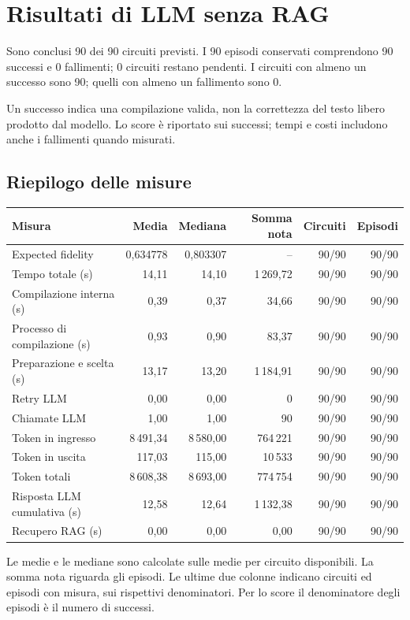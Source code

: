 \providecommand{\TestReportPath}{../}
\section{Risultati di LLM senza RAG}
Sono conclusi 90 dei 90 circuiti previsti. I 90 episodi conservati comprendono 90 successi e 0 fallimenti; 0 circuiti restano pendenti. I circuiti con almeno un successo sono 90; quelli con almeno un fallimento sono 0.

Un successo indica una compilazione valida, non la correttezza del testo libero prodotto dal modello. Lo score è riportato sui successi; tempi e costi includono anche i fallimenti quando misurati.

\subsection{Riepilogo delle misure}
\begingroup\footnotesize
\setlength{\tabcolsep}{5pt}
\begin{center}
\begin{tabular}{lrrrrr}
\toprule
Misura & Media & Mediana & Somma nota & Circuiti & Episodi \\
\midrule
Expected fidelity & 0,634778 & 0,803307 & -- & 90/90 & 90/90 \\
Tempo totale (s) & 14,11 & 14,10 & 1\,269,72 & 90/90 & 90/90 \\
Compilazione interna (s) & 0,39 & 0,37 & 34,66 & 90/90 & 90/90 \\
Processo di compilazione (s) & 0,93 & 0,90 & 83,37 & 90/90 & 90/90 \\
Preparazione e scelta (s) & 13,17 & 13,20 & 1\,184,91 & 90/90 & 90/90 \\
Retry LLM & 0,00 & 0,00 & 0 & 90/90 & 90/90 \\
Chiamate LLM & 1,00 & 1,00 & 90 & 90/90 & 90/90 \\
Token in ingresso & 8\,491,34 & 8\,580,00 & 764\,221 & 90/90 & 90/90 \\
Token in uscita & 117,03 & 115,00 & 10\,533 & 90/90 & 90/90 \\
Token totali & 8\,608,38 & 8\,693,00 & 774\,754 & 90/90 & 90/90 \\
Risposta LLM cumulativa (s) & 12,58 & 12,64 & 1\,132,38 & 90/90 & 90/90 \\
Recupero RAG (s) & 0,00 & 0,00 & 0,00 & 90/90 & 90/90 \\
\bottomrule
\end{tabular}
\end{center}
\endgroup
Le medie e le mediane sono calcolate sulle medie per circuito disponibili. La somma nota riguarda gli episodi. Le ultime due colonne indicano circuiti ed episodi con misura, sui rispettivi denominatori. Per lo score il denominatore degli episodi è il numero di successi.

